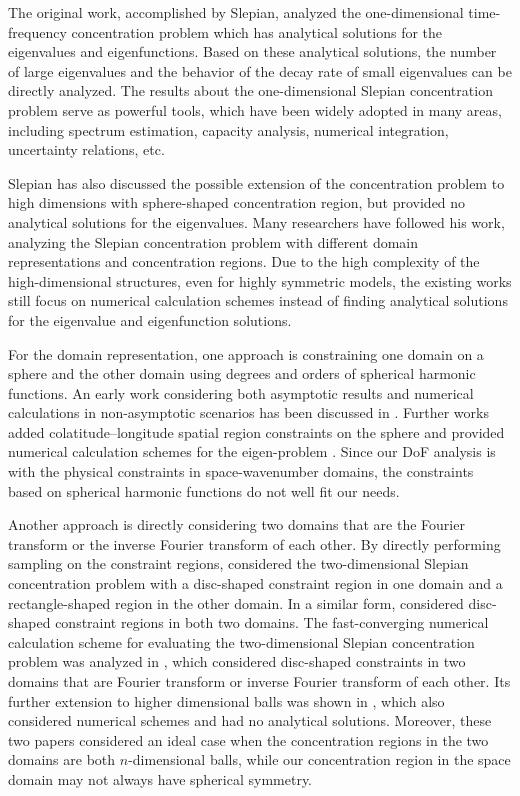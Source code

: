 \documentclass[12pt,draftclsnofoot,journal,onecolumn]{IEEEtran}
\begin{document}
	{\color{red}
	The original work, accomplished by Slepian, analyzed the one-dimensional time-frequency concentration problem which has analytical solutions for the eigenvalues and eigenfunctions\cite{slepian1961prolate}. Based on these analytical solutions, the number of large eigenvalues and the behavior of the decay rate of small eigenvalues can be directly analyzed. The results about the one-dimensional Slepian concentration problem serve as powerful tools, which have been widely adopted in many areas, including spectrum estimation\cite{thomson2005spectrum}, capacity analysis\cite{cover1999elements}, numerical integration\cite{xiao2001prolate}, uncertainty relations\cite{furrer2014position}, etc.
	
	Slepian has also discussed the possible extension of the concentration problem to high dimensions with sphere-shaped concentration region\cite{slepian1964prolate}, but provided no analytical solutions for the eigenvalues. Many researchers have followed his work, analyzing the Slepian concentration problem with different domain representations and concentration regions. Due to the high complexity of the high-dimensional structures, even for highly symmetric models, the existing works still focus on numerical calculation schemes instead of finding analytical solutions for the eigenvalue and eigenfunction solutions. 

	For the domain representation, one approach is constraining one domain on a sphere and the other domain using degrees and orders of spherical harmonic functions. An early work considering both asymptotic results and numerical calculations in non-asymptotic scenarios has been discussed in \cite{simons2006spatiospectral}. Further works added colatitude–longitude spatial region constraints on the sphere and provided numerical calculation schemes for the eigen-problem \cite{bates2016slepian}. Since our DoF analysis is with the physical constraints in space-wavenumber domains, the constraints based on spherical harmonic functions do not well fit our needs. 
	
	Another approach is directly considering two domains that are the Fourier transform or the inverse Fourier transform of each other. By directly performing sampling on the constraint regions, \cite{beylkin2007grids} considered the two-dimensional Slepian concentration problem with a disc-shaped constraint region in one domain and a rectangle-shaped region in the other domain. In a similar form, \cite{simons2011spatiospectral} considered disc-shaped constraint regions in both two domains. 
	The fast-converging numerical calculation scheme for evaluating the two-dimensional Slepian concentration problem was analyzed in \cite{shkolnisky2007prolate}, which considered disc-shaped constraints in two domains that are Fourier transform or inverse Fourier transform of each other. 
	Its further extension to higher dimensional balls was shown in \cite{zhang2020ball}, which also considered numerical schemes and had no analytical solutions. Moreover, these two papers considered an ideal case when the concentration regions in the two domains are both $n$-dimensional balls, while our concentration region in the space domain may not always have spherical symmetry. 

}
\end{document}
